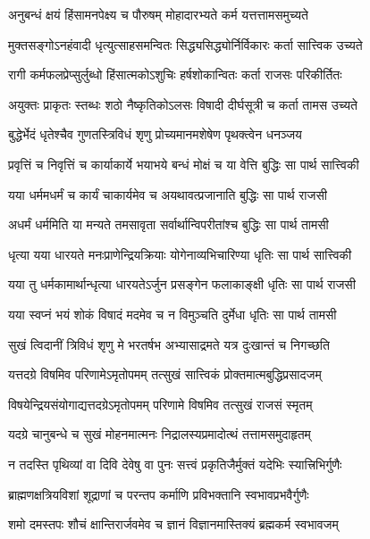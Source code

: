 \twolineshloka
{अनुबन्धं क्षयं हिंसामनपेक्ष्य च पौरुषम्}
{मोहादारभ्यते कर्म यत्तत्तामसमुच्यते}%

\twolineshloka
{मुक्तसङ्गोऽनहंवादी धृत्युत्साहसमन्वितः}
{सिद्ध्यसिद्ध्योर्निर्विकारः कर्ता सात्त्विक उच्यते}%

\twolineshloka
{रागी कर्मफलप्रेप्सुर्लुब्धो हिंसात्मकोऽशुचिः}
{हर्षशोकान्वितः कर्ता राजसः परिकीर्तितः}%

\twolineshloka
{अयुक्तः प्राकृतः स्तब्धः शठो नैष्कृतिकोऽलसः}
{विषादी दीर्घसूत्री च कर्ता तामस उच्यते}%

\twolineshloka
{बुद्धेर्भेदं धृतेश्चैव गुणतस्त्रिविधं शृणु}
{प्रोच्यमानमशेषेण पृथक्त्वेन धनञ्जय}%

\twolineshloka
{प्रवृत्तिं च निवृत्तिं च कार्याकार्ये भयाभये}
{बन्धं मोक्षं च या वेत्ति बुद्धिः सा पार्थ सात्त्विकी}
{}%

\twolineshloka
{यया धर्ममधर्मं च कार्यं चाकार्यमेव च}
{अयथावत्प्रजानाति बुद्धिः सा पार्थ राजसी}%

\twolineshloka
{अधर्मं धर्ममिति या मन्यते तमसावृता}
{सर्वार्थान्विपरीतांश्च बुद्धिः सा पार्थ तामसी}%

\twolineshloka
{धृत्या यया धारयते मनःप्राणेन्द्रियक्रियाः}
{योगेनाव्यभिचारिण्या धृतिः सा पार्थ सात्त्विकी}%

\twolineshloka
{यया तु धर्मकामार्थान्धृत्या धारयतेऽर्जुन}
{प्रसङ्गेन फलाकाङ्क्षी धृतिः सा पार्थ राजसी}%

\twolineshloka
{यया स्वप्नं भयं शोकं विषादं मदमेव च}
{न विमुञ्चति दुर्मेधा धृतिः सा पार्थ तामसी}%

\twolineshloka
{सुखं त्विदानीं त्रिविधं शृणु मे भरतर्षभ}
{अभ्यासाद्रमते यत्र दुःखान्तं च निगच्छति}%

\twolineshloka
{यत्तदग्रे विषमिव परिणामेऽमृतोपमम्}
{तत्सुखं सात्त्विकं प्रोक्तमात्मबुद्धिप्रसादजम्}%

\twolineshloka
{विषयेन्द्रियसंयोगाद्यत्तदग्रेऽमृतोपमम्}
{परिणामे विषमिव तत्सुखं राजसं स्मृतम्}%

\twolineshloka
{यदग्रे चानुबन्धे च सुखं मोहनमात्मनः}
{निद्रालस्यप्रमादोत्थं तत्तामसमुदाहृतम्}%

\twolineshloka
{न तदस्ति पृथिव्यां वा दिवि देवेषु वा पुनः}
{सत्त्वं प्रकृतिजैर्मुक्तं यदेभिः स्यात्त्रिभिर्गुणैः}%

\twolineshloka
{ब्राह्मणक्षत्रियविशां शूद्राणां च परन्तप}
{कर्माणि प्रविभक्तानि स्वभावप्रभवैर्गुणैः}%

\twolineshloka
{शमो दमस्तपः शौचं क्षान्तिरार्जवमेव च}
{ज्ञानं विज्ञानमास्तिक्यं ब्रह्मकर्म स्वभावजम्}%

